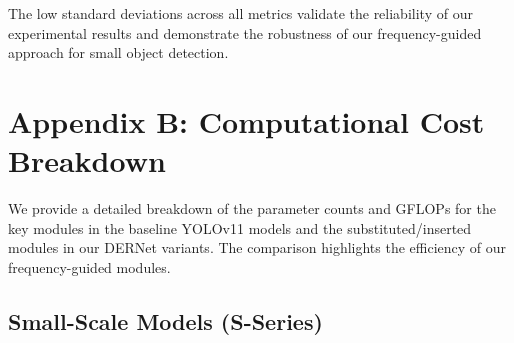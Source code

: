 \documentclass{article}
\theoremstyle{plain}
\theoremstyle{definition}
\theoremstyle{remark}
\begin{document}
\begin{table}[h]
\centering
\caption{Reproducibility analysis of YOLOv11 and DERNet models with different random seeds on VisDrone2019 validation set. Results are reported as mean${\pm}$std over three runs.}
\label{tab:stability}
\vspace{0.1cm}
\end{table}

The low standard deviations across all metrics validate the reliability of our experimental results and demonstrate the robustness of our frequency-guided approach for small object detection.

\section{Appendix B: Computational Cost Breakdown}
\label{sec:appendix_b_computational_cost}

We provide a detailed breakdown of the parameter counts and GFLOPs for the key modules in the baseline YOLOv11 models and the substituted/inserted modules in our DERNet variants. The comparison highlights the efficiency of our frequency-guided modules.

\subsection{Small-Scale Models (S-Series)}
\end{document}
